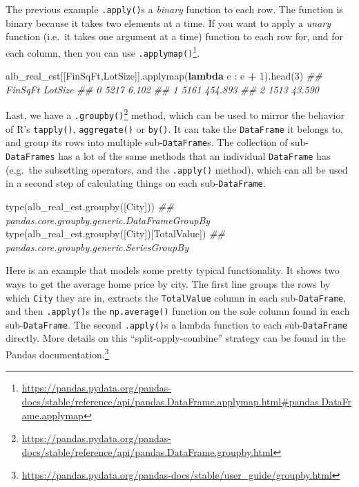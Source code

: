 \documentclass[
  12pt,
  krantz2]{krantz}
\makeatletter
\newenvironment{Shaded}{\begin{snugshade}}{\end{snugshade}}
\newcommand{\BuiltInTok}[1]{#1}
\newcommand{\CommentTok}[1]{\textcolor[rgb]{0.37,0.37,0.37}{\textit{#1}}}
\newcommand{\DecValTok}[1]{\textcolor[rgb]{0.06,0.06,0.06}{#1}}
\newcommand{\KeywordTok}[1]{\textcolor[rgb]{0.27,0.27,0.27}{\textbf{#1}}}
\newcommand{\NormalTok}[1]{#1}
\newcommand{\OperatorTok}[1]{\textcolor[rgb]{0.43,0.43,0.43}{\textbf{#1}}}
\newcommand{\StringTok}[1]{\textcolor[rgb]{0.5,0.5,0.5}{#1}}
\renewcommand{\href}[2]{#2\footnote{\url{#1}}}
\newenvironment{kframe}{%
\medskip{}
\setlength{\fboxsep}{.8em}
 \def\at@end@of@kframe{}%
 \ifinner\ifhmode%
  \def\at@end@of@kframe{\end{minipage}}%
  \begin{minipage}{\columnwidth}%
 \fi\fi%
 \def\FrameCommand##1{\hskip\@totalleftmargin \hskip-\fboxsep
 \colorbox{shadecolor}{##1}\hskip-\fboxsep
     \hskip-\linewidth \hskip-\@totalleftmargin \hskip\columnwidth}%
 \MakeFramed {\advance\hsize-\width
   \@totalleftmargin\z@ \linewidth\hsize
   \@setminipage}}%
 {\par\unskip\endMakeFramed%
 \at@end@of@kframe}
\renewenvironment{Shaded}{\begin{kframe}}{\end{kframe}}
\makeatother
\begin{document}
The previous example \texttt{.apply()}s a \emph{binary} function to each row. The function is binary because it takes two elements at a time. If you want to apply a \emph{unary} function (i.e.~it takes one argument at a time) function to each row for, and for each column, then you can use \href{https://pandas.pydata.org/pandas-docs/stable/reference/api/pandas.DataFrame.applymap.html\#pandas.DataFrame.applymap}{\texttt{.applymap()}}.

\begin{Shaded}
\begin{Highlighting}[]
\NormalTok{alb\_real\_est[[}\StringTok{\textquotesingle{}FinSqFt\textquotesingle{}}\NormalTok{,}\StringTok{\textquotesingle{}LotSize\textquotesingle{}}\NormalTok{]].applymap(}\KeywordTok{lambda}\NormalTok{ e : e }\OperatorTok{+} \DecValTok{1}\NormalTok{).head(}\DecValTok{3}\NormalTok{)}
\CommentTok{\#\#    FinSqFt  LotSize}
\CommentTok{\#\# 0     5217    6.102}
\CommentTok{\#\# 1     5161  454.893}
\CommentTok{\#\# 2     1513   43.590}
\end{Highlighting}
\end{Shaded}

Last, we have a \href{https://pandas.pydata.org/pandas-docs/stable/reference/api/pandas.DataFrame.groupby.html}{\texttt{.groupby()}} method, which can be used to mirror the behavior of R's \texttt{tapply()}, \texttt{aggregate()} or \texttt{by()}. It can take the \texttt{DataFrame} it belongs to, and group its rows into multiple sub-\texttt{DataFrame}s. The collection of sub-\texttt{DataFrames} has a lot of the same methods that an individual \texttt{DataFrame} has (e.g.~the subsetting operators, and the \texttt{.apply()} method), which can all be used in a second step of calculating things on each sub-\texttt{DataFrame}.

\begin{Shaded}
\begin{Highlighting}[]
\BuiltInTok{type}\NormalTok{(alb\_real\_est.groupby([}\StringTok{\textquotesingle{}City\textquotesingle{}}\NormalTok{]))}
\CommentTok{\#\# pandas.core.groupby.generic.DataFrameGroupBy}
\BuiltInTok{type}\NormalTok{(alb\_real\_est.groupby([}\StringTok{\textquotesingle{}City\textquotesingle{}}\NormalTok{])[}\StringTok{\textquotesingle{}TotalValue\textquotesingle{}}\NormalTok{])}
\CommentTok{\#\# pandas.core.groupby.generic.SeriesGroupBy}
\end{Highlighting}
\end{Shaded}

Here is an example that models some pretty typical functionality. It shows two ways to get the average home price by city. The first line groups the rows by which \texttt{City} they are in, extracts the \texttt{TotalValue} column in each sub-\texttt{DataFrame}, and then \texttt{.apply()}s the \texttt{np.average()} function on the sole column found in each sub-\texttt{DataFrame}. The second \texttt{.apply()}s a lambda function to each sub-\texttt{DataFrame} directly. More details on this ``split-apply-combine'' strategy can be found in the \href{https://pandas.pydata.org/pandas-docs/stable/user_guide/groupby.html}{Pandas documentation.}
\end{document}
